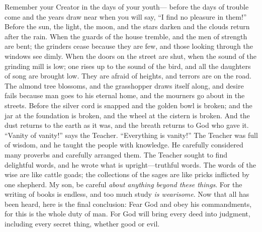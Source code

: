 \begin{biblechapter} %
 Remember your Creator in the days of your youth— 
before the days of trouble come 
and the years draw near when you will say, 
“I find no pleasure in them!”
\verse Before the sun, the light, the moon, and the stars darken 
and the clouds return after the rain.
\verse When the guards of the house tremble, 
and the men of strength are bent; 
the grinders cease because they are few, 
and those looking through the windows see dimly.
\verse When the doors on the street are shut, 
when the sound of the grinding mill is low; 
one rises up to the sound of the bird, 
and all the daughters of song are brought low.
\verse They are afraid of heights, 
and terrors are on the road. 
The almond tree blossoms, 
and the grasshopper draws itself along, and desire fails 
because man goes to his eternal home, 
and the mourners go about in the streets.
\verse Before the silver cord is snapped 
and the golden bowl is broken; 
and the jar at the foundation is broken, 
and the wheel at the cistern is broken.
\verse And the dust returns to the earth as it was, 
and the breath returns to God who gave it.
 “Vanity of vanity!” says the Teacher. 
“Everything is vanity!”
 The Teacher was full of wisdom, and he taught the people with knowledge. He carefully considered many proverbs and carefully arranged them.
\verse The Teacher sought to find delightful words, and he wrote what is upright—truthful words.
\verse The words of the wise are like cattle goads; the collections of the sages are like pricks inflicted by one shepherd.
\verse My son, be careful \textit{about anything beyond these things}. For the writing of books is endless, and too much study \textit{is wearisome}.
\verse Now that all has been heard, here is the final conclusion: 
Fear God and obey his commandments, 
for this is the whole duty of man.
\verse For God will bring every deed into judgment, 
including every secret thing, whether good or evil.
\end{biblechapter}

